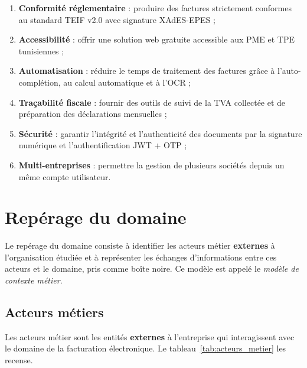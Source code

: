 \documentclass[a4paper,12pt]{report}
\begin{document}
\begin{enumerate}
    \item \textbf{Conformité réglementaire} : produire des factures strictement conformes au standard TEIF v2.0 avec signature XAdES-EPES ;
    \item \textbf{Accessibilité} : offrir une solution web gratuite accessible aux PME et TPE tunisiennes ;
    \item \textbf{Automatisation} : réduire le temps de traitement des factures grâce à l'auto-complétion, au calcul automatique et à l'OCR ;
    \item \textbf{Traçabilité fiscale} : fournir des outils de suivi de la TVA collectée et de préparation des déclarations mensuelles ;
    \item \textbf{Sécurité} : garantir l'intégrité et l'authenticité des documents par la signature numérique et l'authentification JWT + OTP ;
    \item \textbf{Multi-entreprises} : permettre la gestion de plusieurs sociétés depuis un même compte utilisateur.
\end{enumerate}


\section{Repérage du domaine}

Le repérage du domaine consiste à identifier les acteurs métier \textbf{externes} à l'organisation étudiée et à représenter les échanges d'informations entre ces acteurs et le domaine, pris comme boîte noire. Ce modèle est appelé le \textit{modèle de contexte métier}.

\subsection{Acteurs métiers}

Les acteurs métier sont les entités \textbf{externes} à l'entreprise qui interagissent avec le domaine de la facturation électronique. Le tableau~\ref{tab:acteurs_metier} les recense.
\end{document}
